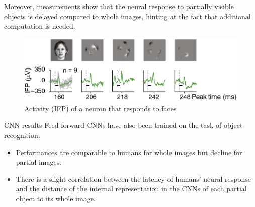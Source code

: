 \begin{casestudy}
\begin{descriptionlist}
            Moreover, measurements show that the neural response to partially visible objects is delayed compared to whole images, 
            hinting at the fact that additional computation is needed.
            \begin{figure}[H]
                \centering
                \includegraphics[width=0.5\linewidth]{./img/pattern_completion3.png}
                \caption{
                    Activity (IFP) of a neuron that responds to faces
                }
            \end{figure}

        \item[CNN results]
            Feed-forward CNNs have also been trained on the task of object recognition.
            \begin{itemize}
                \item Performances are comparable to humans for whole images but decline for partial images.
                \item There is a slight correlation between the latency of humans' neural response and 
                    the distance of the internal representation in the CNNs of each partial object to its whole image.
            \end{itemize}
        

\end{descriptionlist}
\end{casestudy}
